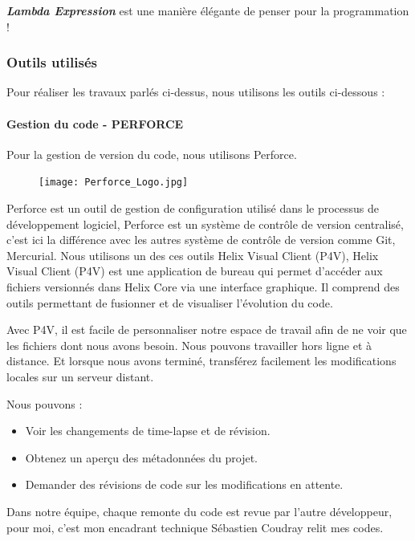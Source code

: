     \par \textit{\textbf{Lambda Expression}} est une manière élégante de penser pour la programmation ! 
    
    
    \subsubsection{Outils utilisés}
    Pour réaliser les travaux parlés ci-dessus, nous utilisons les outils ci-dessous : 
    \paragraph{Gestion du code - PERFORCE}
    Pour la gestion de version du code, nous utilisons Perforce.
    \begin{figure}[H]
    	\flushleft
    	\texttt{[image: Perforce\_Logo.jpg]}
    	\label{fig:Perforce_Logo}
    \end{figure}
    \par Perforce est un outil de gestion de configuration utilisé dans le processus de développement logiciel, Perforce est un système de contrôle de version centralisé, c'est ici la différence avec les autres système de contrôle de version comme Git, Mercurial. Nous utilisons un des ces outils Helix Visual Client (P4V), Helix Visual Client (P4V) est une application de bureau qui permet d’accéder aux fichiers versionnés dans Helix Core via une interface graphique. Il comprend des outils permettant de fusionner et de visualiser l'évolution du code.
    \par Avec P4V, il est facile de personnaliser notre espace de travail afin de ne voir que les fichiers dont nous avons besoin. Nous pouvons travailler hors ligne et à distance. Et lorsque nous avons terminé, transférez facilement les modifications locales sur un serveur distant. 
    \par Nous pouvons :
    \begin{itemize}
    	\item Voir les changements de time-lapse et de révision. 
    	\item Obtenez un aperçu des métadonnées du projet.
    	\item Demander des révisions de code sur les modifications en attente.
    \end{itemize} 
    \par Dans notre équipe, chaque remonte du code est revue par l'autre développeur, pour moi, c'est mon encadrant technique Sébastien Coudray relit mes codes. 
    
